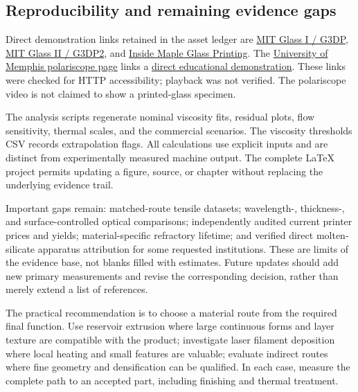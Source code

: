 \subsection{Reproducibility and remaining evidence gaps}
Direct demonstration links retained in the asset ledger are \href{https://vimeo.com/136764796}{MIT Glass I / G3DP}, \href{https://vimeo.com/211778198}{MIT Glass II / G3DP2}, and \href{https://www.youtube.com/watch?v=CSw0Kw6M8i0}{Inside Maple Glass Printing}. The \href{https://www.memphis.edu/physics/demonstrations/polariscope.php}{University of Memphis polariscope page} links a \href{https://www.youtube.com/watch?v=IefRrdTmlbA}{direct educational demonstration}. These links were checked for HTTP accessibility; playback was not verified. The polariscope video is not claimed to show a printed-glass specimen.

The analysis scripts regenerate nominal viscosity fits, residual plots, flow sensitivity, thermal scales, and the commercial scenarios. The viscosity thresholds CSV records extrapolation flags. All calculations use explicit inputs and are distinct from experimentally measured machine output. The complete LaTeX project permits updating a figure, source, or chapter without replacing the underlying evidence trail.

Important gaps remain: matched-route tensile datasets; wavelength-, thickness-, and surface-controlled optical comparisons; independently audited current printer prices and yields; material-specific refractory lifetime; and verified direct molten-silicate apparatus attribution for some requested institutions. These are limits of the evidence base, not blanks filled with estimates. Future updates should add new primary measurements and revise the corresponding decision, rather than merely extend a list of references.

The practical recommendation is to choose a material route from the required final function. Use reservoir extrusion where large continuous forms and layer texture are compatible with the product; investigate laser filament deposition where local heating and small features are valuable; evaluate indirect routes where fine geometry and densification can be qualified. In each case, measure the complete path to an accepted part, including finishing and thermal treatment.
